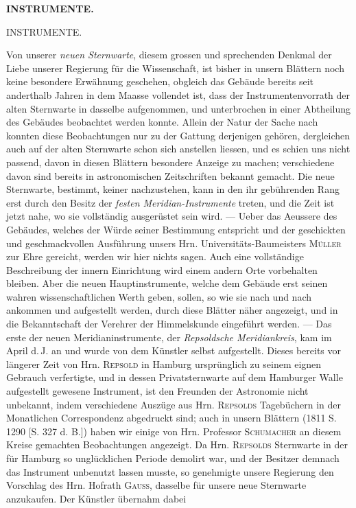 \clearpage
\noindent{}%
%
\parbox[t]{\dimexpr\linewidth-24mm\relax}{\centering\footnotesize\bfseries INSTRUMENTE.\par}%
\makebox[12mm][r]{}\par\nobreak\medskip
\begin{center}
\Large INSTRUMENTE.
\end{center}


\par\indent Von unserer \emph{neuen Sternwarte}, diesem grossen und sprechenden Denkmal der Liebe unserer Regierung für die Wissenschaft, ist bisher in unsern Blättern noch keine besondere Erwähnung geschehen, obgleich das Gebäude bereits seit anderthalb Jahren in dem Maasse vollendet ist, dass der Instrumentenvorrath der alten Sternwarte in dasselbe aufgenommen, und unterbrochen in einer Abtheilung des Gebäudes beobachtet werden konnte. Allein der Natur der Sache nach konnten diese Beobachtungen nur zu der Gattung derjenigen gehören, dergleichen auch auf der alten Sternwarte schon sich anstellen liessen, und es schien uns nicht passend, davon in diesen Blättern besondere Anzeige zu machen; verschiedene davon sind bereits in astronomischen Zeitschriften bekannt gemacht. Die neue Sternwarte, bestimmt, keiner nachzustehen, kann in den ihr gebührenden Rang erst durch den Besitz der \emph{festen Meridian-Instrumente} treten, und die Zeit ist jetzt nahe, wo sie vollständig ausgerüstet sein wird. --- Ueber das Aeussere des Gebäudes, welches der Würde seiner Bestimmung entspricht und der geschickten und geschmackvollen Ausführung unsers Hrn. Universitäts-Baumeisters \textsc{Müller} zur Ehre gereicht, werden wir hier nichts sagen. Auch eine vollständige Beschreibung der innern Einrichtung wird einem andern Orte vorbehalten bleiben. Aber die neuen Hauptinstrumente, welche dem Gebäude erst seinen wahren wissenschaftlichen Werth geben, sollen, so wie sie nach und nach ankommen und aufgestellt werden, durch diese Blätter näher angezeigt, und in die Bekanntschaft der Verehrer der Himmelskunde eingeführt werden. --- Das erste der neuen Meridianinstrumente, der \emph{Repsoldsche Meridiankreis}, kam im April d.\,J. an und wurde von dem Künstler selbst aufgestellt. Dieses bereits vor längerer Zeit von Hrn. \textsc{Repsold} in Hamburg ursprünglich zu seinem eignen Gebrauch verfertigte, und in dessen Privatsternwarte auf dem Hamburger Walle aufgestellt gewesene Instrument, ist den Freunden der Astronomie nicht unbekannt, indem verschiedene Auszüge aus Hrn. \textsc{Repsolds} Tagebüchern in der Monatlichen Correspondenz abgedruckt sind; auch in unsern Blättern (1811 S. 1290 [S. 327 d. B.]) haben wir einige von Hrn. Professor \textsc{Schumacher} an diesem Kreise gemachten Beobachtungen angezeigt. Da Hrn. \textsc{Repsolds} Sternwarte in der für Hamburg so unglücklichen Periode demolirt war, und der Besitzer demnach das Instrument unbenutzt lassen musste, so genehmigte unsere Regierung den Vorschlag des Hrn. Hofrath \textsc{Gauss}, dasselbe für unsere neue Sternwarte anzukaufen. Der Künstler übernahm dabei 